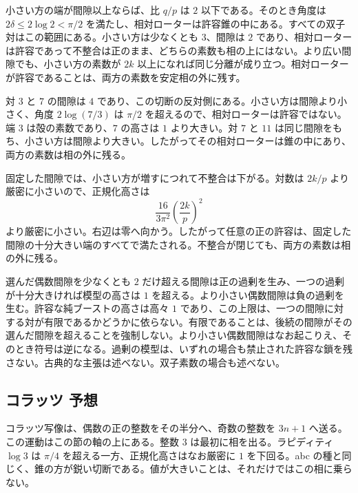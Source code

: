 \documentclass[a4paper]{article}
\theoremstyle{definition}
\theoremstyle{remark}
\begin{document}
小さい方の端が間隙以上ならば、比 \(q/p\) は \(2\) 以下である。そのとき角度は \(2\delta\le 2\log 2<\pi/2\) を満たし、相対ローターは許容錐の中にある。すべての双子対はこの範囲にある。小さい方は少なくとも \(3\)、間隙は \(2\) であり、相対ローターは許容であって不整合は正のまま、どちらの素数も相の上にはない。より広い間隙でも、小さい方の素数が \(2k\) 以上になれば同じ分離が成り立つ。相対ローターが許容であることは、両方の素数を安定相の外に残す。

対 \(3\) と \(7\) の間隙は \(4\) であり、この切断の反対側にある。小さい方は間隙より小さく、角度 \(2\log(7/3)\) は \(\pi/2\) を超えるので、相対ローターは許容ではない。端 \(3\) は殻の素数であり、\(7\) の高さは \(1\) より大きい。対 \(7\) と \(11\) は同じ間隙をもち、小さい方は間隙より大きい。したがってその相対ローターは錐の中にあり、両方の素数は相の外に残る。

固定した間隙では、小さい方が増すにつれて不整合は下がる。対数は \(2k/p\) より厳密に小さいので、正規化高さは
\[
\frac{16}{3\pi^2}\left(\frac{2k}{p}\right)^2
\]
より厳密に小さい。右辺は零へ向かう。したがって任意の正の許容は、固定した間隙の十分大きい端のすべてで満たされる。不整合が閉じても、両方の素数は相の外に残る。

選んだ偶数間隙を少なくとも \(2\) だけ超える間隙は正の過剰を生み、一つの過剰が十分大きければ模型の高さは \(1\) を超える。より小さい偶数間隙は負の過剰を生む。許容な純ブーストの高さは高々 \(1\) であり、この上限は、一つの間隙に対する対が有限であるかどうかに依らない。有限であることは、後続の間隙がその選んだ間隙を超えることを強制しない。より小さい偶数間隙はなお起こりえ、そのとき符号は逆になる。過剰の模型は、いずれの場合も禁止された許容な鎖を残さない。古典的な主張は述べない。双子素数の場合も述べない。

\subsection{コラッツ 予想}

コラッツ写像は、偶数の正の整数をその半分へ、奇数の整数を \(3n+1\) へ送る。この運動はこの節の軸の上にある。整数 \(3\) は最初に相を出る。ラピディティ \(\log 3\) は \(\pi/4\) を超える一方、正規化高さはなお厳密に \(1\) を下回る。abc の種と同じく、錐の方が鋭い切断である。値が大きいことは、それだけではこの相に乗らない。
\end{document}
